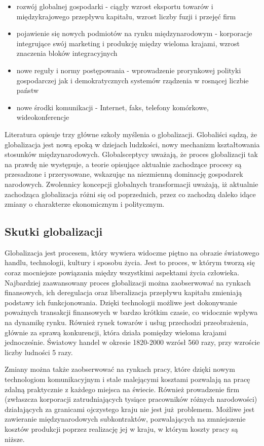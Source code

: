 \documentclass[12pt]{extarticle}
\begin{document}
\begin{itemize}
	\item rozwój globalnej gospodarki - ciągły wzrost eksportu towarów i międzykrajowego przepływu kapitału, wzrost liczby fuzji i przejęć firm
	\item pojawienie się nowych podmiotów na rynku międzynarodowym - korporacje integrujące swój marketing i produkcję między wieloma krajami, wzrost znaczenia bloków integracyjnych
	\item nowe reguły i normy postępowania - wprowadzenie prorynkowej polityki gospodarczej jak i demokratycznych systemów rządzenia w rosnącej liczbie państw 
	\item nowe środki komunikacji - Internet, faks, telefony komórkowe, wideokonferencje
\end{itemize}

Literatura opisuje trzy główne szkoły myślenia o globalizacji. Globaliści sądzą, że globalizacja jest nową epoką w dziejach ludzkości, nowy mechanizm kształtowania stosunków międzynarodowych. Globalsceptycy uważają, że proces globalizacji tak na prawdę nie występuje, a teorie opisujące aktualnie zachodzące procesy są przesadzone i przerysowane, wskazując na niezmienną dominację gospodarek narodowych. Zwolennicy koncepcji globalnych transformacji uważają, iż aktualnie zachodząca globalizacja różni się od poprzednich, przez co zachodzą daleko idące zmiany o charakterze ekonomicznym i politycznym.

\subsection{Skutki globalizacji}

Globalizacja jest procesem, który wywiera widoczne piętno na obrazie światowego handlu, technologii, kultury i sposobu życia. Jest to proces, w którym tworzą się coraz mocniejsze powiązania między wszystkimi aspektami życia człowieka. Najbardziej zaawansowany proces globalizacji można zaobserwować na rynkach finansowych, ich deregulacja oraz liberalizacja przepływu kapitału zmieniają podstawy ich funkcjonowania. Dzięki technologii możliwe jest dokonywanie poważnych transakcji finansowych w bardzo krótkim czasie, co widocznie wpływa na dynamikę rynku. Również rynek towarów i usług przechodzi przeobrażenia, głównie za sprawą konkurencji, która działa pomiędzy wieloma krajami jednocześnie. Światowy handel w okresie 1820-2000 wzrósł 560 razy, przy wzroście liczby ludności 5 razy.

Zmiany można także zaobserwować na rynkach pracy, które dzięki nowym technologiom komunikacyjnym i stale malejącymi kosztami pozwalają na pracę zdalną praktycznie z każdego miejsca na świecie. Również prowadzenie firm (zwłaszcza korporacji zatrudniających tysiące pracowników różnych narodowości) działających za granicami ojczystego kraju nie jest już problemem. Możliwe jest zawieranie międzynarodowych subkontraktów, pozwalających na zmniejszenie kosztów produkcji poprzez realizację jej w kraju, w którym koszty pracy są niższe.
\end{document}
